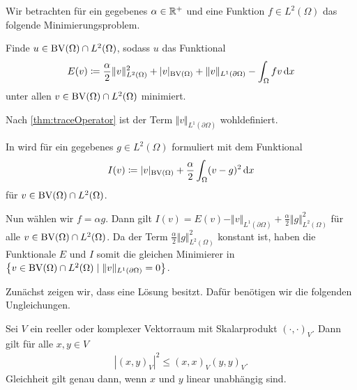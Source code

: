 Wir betrachten für ein gegebenes $\alpha\in\mathbb{R}^+$ und eine Funktion
$f\in L^2(\Omega)$ das 
folgende Minimierungsproblem. 

\begin{problem}\label{prob:continuousProblem}
  Finde $u\in \textup{BV}(\Omega)\cap L^2(\Omega)$, sodass
  $u$ das Funktional
  \begin{align}\label{eq:continuousProblem}
    E(v)\coloneqq \frac{\alpha}{2}\Vert v\Vert_{L^2(\Omega)}^2 + |v|_{\textup{BV}(\Omega)}
    +\Vert v\Vert_{L^1(\partial\Omega)}-\int_\Omega fv\,\mathrm{d}x
  \end{align}
  unter allen $v\in\textup{BV}(\Omega)\cap L^2(\Omega)$ minimiert.

  Nach \cref{thm:traceOperator} ist der Term $\Vert
  v\Vert_{L^1(\partial\Omega)}$ wohldefiniert.
\end{problem}

\begin{remark}
  In \cite[Kapitel~10.1.3]{Bar15} wird  für ein
  gegebenes $g\in L^2(\Omega)$ formuliert
  mit dem Funktional 
  \begin{align*}
    I(v)\coloneqq |v|_{\textup{BV}(\Omega)} + \frac{\alpha}{2}\int_\Omega (v-g)^2\,\mathrm{d}x
  \end{align*}
  für $v\in \textup{BV}(\Omega)\cap L^2(\Omega)$.

  Nun wählen wir $f = \alpha g$. Dann gilt
  $I(v) = E(v) - \Vert v\Vert_{L^1(\partial \Omega)}+ 
  \frac{\alpha}{2}\Vert g\Vert_{L^2(\Omega)}^2$ für alle 
  $v\in \textup{BV}(\Omega)\cap L^2(\Omega)$. Da der Term $\frac{\alpha}{2}\Vert
  g\Vert_{L^2(\Omega)}^2$ konstant ist, haben die Funktionale $E$ und $I$ somit
  die gleichen Minimierer in $\left\{v\in\textup{BV}(\Omega)\cap L^2(\Omega)\mid 
  \Vert v\Vert_{L^1(\partial\Omega)}=0\right\}$.
\end{remark}

Zunächst zeigen wir, dass  eine Lösung besitzt.
Dafür benötigen wir die folgenden Ungleichungen.

\begin{lemma}
  \label{lem:csu}
  Sei $V$ ein reeller oder komplexer Vektorraum mit Skalarprodukt
  $(\cdot,\cdot)_V$. Dann gilt für alle $x,y\in V$
  \begin{align*}
    |(x,y)_V|^2\leq (x,x)_V (y,y)_V.
  \end{align*}
  Gleichheit gilt genau dann, wenn $x$ und $y$ linear unabhängig sind.
\end{lemma}

